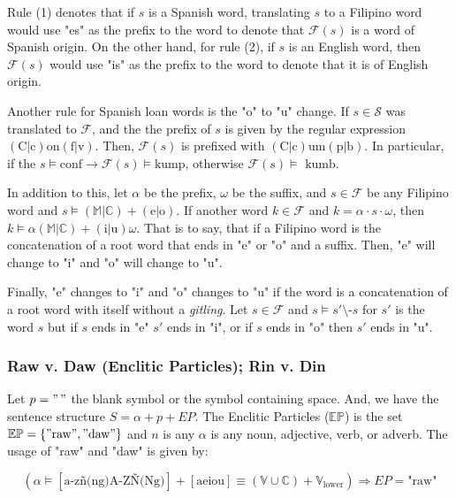 Rule (1) denotes that if \(s\) is a Spanish word, translating \(s\) to a Filipino
word would use "es" as the prefix to the word to denote that \(\mathcal{F}(s)\)
is a word of Spanish origin. On the other hand, for rule (2), if \(s\) is an
English word, then \(\mathcal{F}(s)\) would use "is" as the prefix to the word
to denote that it is of English origin.

Another rule for Spanish loan words is the "o" to "u" change. If \(s\in \mathcal{S}\)
was translated to \(\mathcal{F}\), and the the prefix of \(s\) is given by the
regular expression \((\text{C}|\text{c})\text{on}(\text{f}|\text{v})\). Then,
\(\mathcal{F}(s)\) is prefixed with
\((\text{C}|\text{c})\text{um}(\text{p}|\text{b})\). In particular, if the
\(s \models \text{conf} \rightarrow \mathcal{F}(s) \models \text{kump}\),
otherwise \(\mathcal{F}(s) \models \text{ kumb}\).

In addition to this, let \(\alpha\) be the prefix, \(\omega\) be the suffix, and
\(s\in\mathcal{F}\) be any Filipino word and \(s \models \mathbb{(M|C)}+(\text{e}|\text{o})\).
If another word \(k\in\mathcal{F}\) and \(k=\alpha\cdot s\cdot\omega\), then
\(k\models\alpha\mathbb{(M|C)}+(\text{i}|\text{u})\omega\). That is to say, that
if a Filipino word is the concatenation of a root word that ends in "e" or "o" and
a suffix. Then, "e" will change to "i" and "o" will change to "u".

Finally, "e" changes to "i" and "o" changes to "u" if the word is a concatenation
of a root word with itself without a \textit{gitling}. Let
\(s\in\mathcal{F}\) and \(s\models s'\text{\textbackslash}\text{-}s\)
for \(s'\) is the word \(s\) but if \(s\) ends in "e" \(s'\) ends in "i", or if
\(s\) ends in "o" then \(s'\) ends in "u".

\subsubsection{Raw v. Daw (Enclitic Particles); Rin v. Din}

Let \(p = "\,"\) the blank symbol or the symbol containing space. And, we have the
sentence structure \(S = \alpha + p + EP\). The Enclitic Particles (\(\mathbb{EP}\))
is the set \(\mathbb{EP} = \{"\text{raw}", "\text{daw}"\}\) and \(n\) is any \(\alpha\)
is any noun, adjective, verb, or adverb. The usage of "raw" and "daw" is given by:

\[
    \left(\alpha \models \left[\text{a-zñ(ng)A-ZÑ(Ng)}\right]+\left[\text{aeiou}\right] \equiv (\mathbb{V}\cup\mathbb{C}) + \mathbb{V}_\text{lower}\right)
    \Longrightarrow EP = \text{"raw"}
\]

